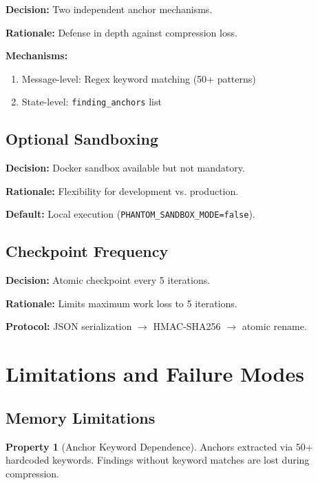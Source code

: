 \documentclass[11pt,a4paper]{article}
\theoremstyle{definition}
\newtheorem{property}{Property}[section]
\newcommand{\code}[1]{\texttt{#1}}
\begin{document}
\textbf{Decision:} Two independent anchor mechanisms.

\textbf{Rationale:} Defense in depth against compression loss.

\textbf{Mechanisms:}
\begin{enumerate}[leftmargin=*]
    \item Message-level: Regex keyword matching (50+ patterns)
    \item State-level: \code{finding\_anchors} list
\end{enumerate}

\subsection{Optional Sandboxing}

\textbf{Decision:} Docker sandbox available but not mandatory.

\textbf{Rationale:} Flexibility for development vs. production.

\textbf{Default:} Local execution (\code{PHANTOM\_SANDBOX\_MODE=false}).

\subsection{Checkpoint Frequency}

\textbf{Decision:} Atomic checkpoint every 5 iterations.

\textbf{Rationale:} Limits maximum work loss to 5 iterations.

\textbf{Protocol:} JSON serialization $\rightarrow$ HMAC-SHA256 $\rightarrow$ atomic rename.

\section{Limitations and Failure Modes}
\label{sec:limitations}

\subsection{Memory Limitations}

\begin{property}[Anchor Keyword Dependence]
Anchors extracted via 50+ hardcoded keywords. Findings without keyword matches are lost during compression.
\end{property}
\end{document}
